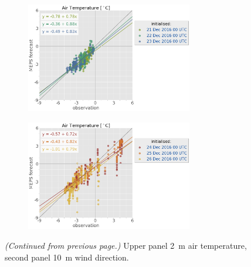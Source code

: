 \begin{figure}
	\begin{subfigure}[b]{0.49\textwidth}
		\centering
		\includegraphics[trim={25.cm 15.5cm 0cm 3.6cm},clip,
		width=0.8\textwidth]{./fig_sfc_temp/obs_model_20161221_23_00_label}
	\end{subfigure}
	\begin{subfigure}[b]{0.49\textwidth}
		\centering
		\includegraphics[trim={25.cm 15.5cm 0cm 3.6cm},clip,
		width=0.8\textwidth]{./fig_sfc_temp/obs_model_20161224_26_00_label}
	\end{subfigure}
    \caption{\textit{(Continued from previous page.)} Upper panel \SI{2}{\metre} air temperature, second panel \SI{10}{\metre} wind direction.}
\end{figure}
